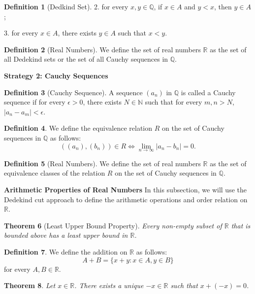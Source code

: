 \documentclass[12pt, reqno]{amsart}
\newtheorem{theorem}{Theorem}[section]
\theoremstyle{definition}
\newtheorem{definition}[theorem]{Definition}
\theoremstyle{remark}
\numberwithin{equation}{section}
\begin{document}
{\begin{definition}[Dedkind Set]
    2. for every $x, y \in \mathbb{Q}$, if $x \in A$ and $y < x$, then $y \in A$;

    3. for every $x \in A$, there exists $y \in A$ such that $x < y$.
\end{definition}

\begin{definition}[Real Numbers]
    We define the set of real numbers $\mathbb{R}$ as the set of all Dedekind sets or the set of all Cauchy sequences in $\mathbb{Q}$.
\end{definition}

\textbf{Strategy 2: Cauchy Sequences}

\begin{definition}[Cauchy Sequence]
    A sequence $(a_n)$ in $\mathbb{Q}$ is called a Cauchy sequence if for every $\epsilon > 0$, there exists $N \in \mathbb{N}$ such that for every $m, n > N$, $|a_n - a_m| < \epsilon$.
\end{definition}


\begin{definition}
    We define the equivalence relation $R$ on the set of Cauchy sequences in $\mathbb{Q}$ as follows:
    \[
        ((a_n), (b_n)) \in R \iff \lim_{n \to \infty} |a_n - b_n| = 0.
    \]
\end{definition}

\begin{definition}[Real Numbers]
    We define the set of real numbers $\mathbb{R}$ as the set of equivalence classes of the relation $R$ on the set of Cauchy sequences in $\mathbb{Q}$.
\end{definition}

\textbf{Arithmetic Properties of Real Numbers}
In this subsection, we will use the Dedekind cut approach to define the arithmetic operations and order relation on $\mathbb{R}$.
\begin{theorem}[Least Upper Bound Property]
    Every non-empty subset of $\mathbb{R}$ that is bounded above has a least upper bound in $\mathbb{R}$.
\end{theorem}   

\begin{definition}
    We define the addition on $\mathbb{R}$ as follows:
    \[
        A + B = \{x + y: x \in A, y \in B\}
    \]
    for every $A, B \in \mathbb{R}$.
\end{definition}

\begin{theorem}
    Let $x \in \mathbb{R}$. There exists a unique $-x \in \mathbb{R}$ such that $x + (-x) = 0$.
\end{theorem}

}
\end{document}
